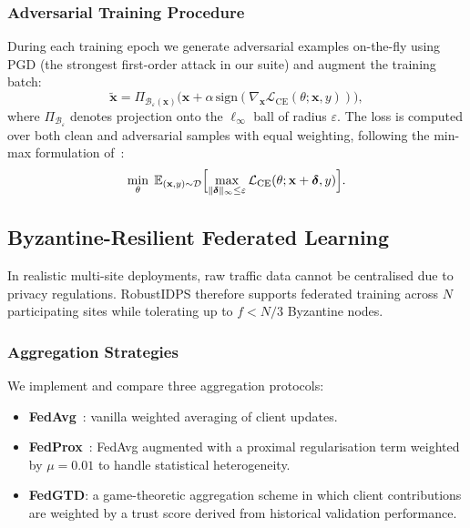 \documentclass[journal,twoside]{IEEEtran}
\begin{document}
\subsubsection{Adversarial Training Procedure}
During each training epoch we generate adversarial examples on-the-fly
using PGD (the strongest first-order attack in our suite) and augment
the training batch:
\begin{equation}
  \tilde{\mathbf{x}} = \Pi_{\mathcal{B}_\varepsilon(\mathbf{x})}
  \!\bigl(\mathbf{x} + \alpha\,\mathrm{sign}(
    \nabla_{\mathbf{x}}\mathcal{L}_{\mathrm{CE}}(\theta;\mathbf{x},y)
  )\bigr),
  \label{eq:pgd_step}
\end{equation}
where $\Pi_{\mathcal{B}_\varepsilon}$ denotes projection onto the
$\ell_\infty$ ball of radius $\varepsilon$.  The loss is computed over
both clean and adversarial samples with equal weighting, following the
min-max formulation of~\cite{madry2018towards}:
\begin{equation}
  \min_\theta\;\mathbb{E}_{(\mathbf{x},y)\sim\mathcal{D}}
  \Bigl[\max_{\|\boldsymbol{\delta}\|_\infty\le\varepsilon}
    \mathcal{L}_{\mathrm{CE}}(\theta;\mathbf{x}+\boldsymbol{\delta},y)
  \Bigr].
  \label{eq:adv_train}
\end{equation}

\subsection{Byzantine-Resilient Federated Learning}
\label{sec:federated}

In realistic multi-site deployments, raw traffic data cannot be
centralised due to privacy regulations.  RobustIDPS therefore supports
federated training across $N$ participating sites while tolerating up to
$f<N/3$ Byzantine nodes.

\subsubsection{Aggregation Strategies}
We implement and compare three aggregation protocols:
\begin{itemize}
  \item \textbf{FedAvg}~\cite{mcmahan2017communication}: vanilla
    weighted averaging of client updates.
  \item \textbf{FedProx}~\cite{li2020federated}: FedAvg augmented with
    a proximal regularisation term weighted by $\mu=0.01$ to handle
    statistical heterogeneity.
  \item \textbf{FedGTD}: a game-theoretic aggregation scheme in which
    client contributions are weighted by a trust score derived from
    historical validation performance.
\end{itemize}
\end{document}
